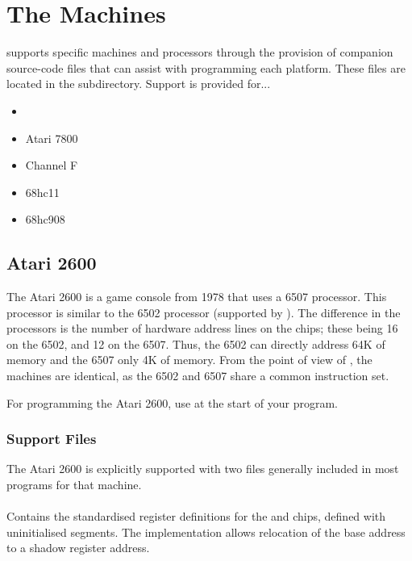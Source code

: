 

\chapter{The Machines}

\dasm supports specific machines and processors through the provision of companion source-code files that can assist with programming each platform. These files are located in the  subdirectory. Support is provided for...

\begin{itemize}
\item {}
\item Atari 7800
\item Channel F
\item 68hc11
\item 68hc908
\end{itemize}


\section{Atari 2600}
\label{machine:atari2600}

The Atari 2600 is a game console from 1978 that uses a 6507 processor. This processor is similar to the 6502 processor (supported by \dasm). The difference in the processors is the number of hardware address lines on the chips; these being 16 on the 6502, and 12 on the 6507. Thus, the 6502 can directly address 64K of memory and the 6507 only 4K of memory.  From the point of view of \dasm, the machines are identical, as the 6502 and 6507 share a common instruction set.

For programming the Atari 2600, use  at the start of your program.

\subsection{Support Files}

The Atari 2600 is explicitly supported with two files generally included in most programs for that machine.

\subsubsection{}

Contains the standardised register definitions for the  and  chips, defined with uninitialised segments. The implementation allows relocation of the  base address to a shadow register address.

